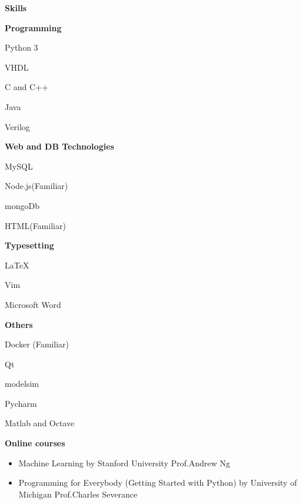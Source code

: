 \documentclass[a4paper,12pt,final]{memoir}
\newcommand{\Sep}{\vspace{1.5em}}
\newcommand{\SmallSep}{\vspace{0.5em}}
\newcommand{\CVSection}[1]
	{\Large\textbf{#1}\par
	\SmallSep\normalsize\normalfont}
\newcommand{\CVItem}[1]
	{\textbf{\color{RoyalBlue} #1}}
\begin{document}
\CVSection{Skills}
\CVItem{Programming}
\begin{multicols}{3}
\begin{compactitem}[\color{RoyalBlue}$\circ$]
	\item Python 3
	\item VHDL
	\item C and C++
	\item Java
	\item Verilog
	
\end{compactitem}
\end{multicols}
\SmallSep
\CVItem{Web and DB Technologies}
\begin{multicols}{3}
\begin{compactitem}[\color{RoyalBlue}$\circ$]
	\item MySQL 	
	\item Node.js(Familiar)
	\item mongoDb
	\item HTML(Familiar)
\end{compactitem}
\end{multicols}
\SmallSep
\CVItem{Typesetting}
\begin{multicols}{3}
\begin{compactitem}[\color{RoyalBlue}$\circ$]
	\item \LaTeX
	\item Vim
	\item Microsoft Word
\end{compactitem}
\end{multicols}
\SmallSep
\CVItem{Others}
\begin{multicols}{3}
\begin{compactitem}[\color{RoyalBlue}$\circ$]
	\item Docker (Familiar)
	\item Qt
	\item modelsim
	\item Pycharm 
	\item Matlab and Octave
\end{compactitem}
\end{multicols}

\Sep 

\CVSection{Online courses}
	\begin{itemize}
		\item  Machine Learning by Stanford University Prof.Andrew Ng
		\item Programming for Everybody (Getting Started with Python) by University of Michigan Prof.Charles Severance
		
	\end{itemize}
\end{document}

